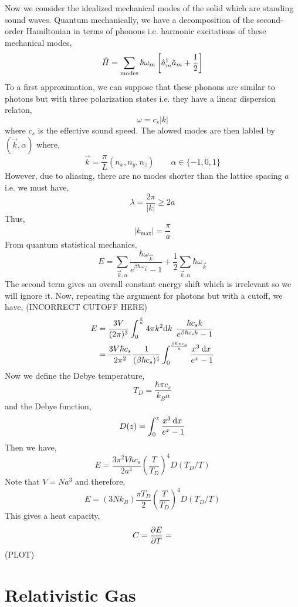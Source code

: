 \documentclass[12pt]{article}
\begin{document}
Now we consider the idealized mechanical modes of the solid which are standing sound waves. Quantum mechanically, we have a decomposition of the second-order Hamiltonian in terms of phonons i.e. harmonic excitations of these mechanical modes,
\[ \hat{H} = \sum_{\text{modes}} \hbar \omega_m \left[ \hat{a}^\dagger_m \hat{a}_m + \frac{1}{2} \right] \]
To a first approximation, we can suppose that these phonons are similar to photons but with three polarization states i.e. they have a linear dispersion relaton,
\[ \omega = c_s |k| \]
where $c_s$ is the effective sound speed. The alowed modes are then labled by $(\vec{k}, \alpha)$ where,
\[ \vec{k} = \frac{\pi}{L} (n_x, n_y, n_z) \quad \quad \alpha \in \{-1, 0, 1 \} \]
However, due to aliasing, there are no modes shorter than the lattice spacing $a$ i.e. we must have,
\[ \lambda = \frac{2 \pi}{|k|} \ge 2 a \]
Thus, 
\[ | k_{\text{max}} | = \frac{\pi}{a} \]
From quantum statistical mechanics,
\[ E = \sum_{\vec{k}, \alpha} \frac{\hbar \omega_{\vec{k}}}{e^{\beta \hbar \omega_{\vec{k}}} - 1} + \frac{1}{2} \sum_{\vec{k}, \alpha} \hbar \omega_{\vec{k}} \]
The second term gives an overall constant energy shift which is irrelevant so we will ignore it. Now, repeating the argument for photons but with a cutoff, we have, (INCORRECT CUTOFF HERE)
\begin{align*}
E & = \frac{3 V}{(2 \pi)^3} \int_0^\frac{\pi}{a} 4 \pi k^2 \mathrm{d}k \: \: \frac{\hbar c_s k}{e^{\beta \hbar c_s k} - 1} 
\\
& = \frac{3 V \hbar c_s}{2 \pi^2} \frac{1}{(\beta \hbar c_s)^4} \int_0^{\frac{\beta \hbar \pi c_s}{a}} \frac{x^3 \: \mathrm{d}x \:}{e^x - 1} 
\end{align*}
Now we define the Debye temperature,
\[ T_D = \frac{\hbar \pi c_s}{k_B a} \]
and the Debye function,
\[ D(z) = \int_0^z \frac{x^3 \: \mathrm{d}x \:}{e^x - 1} \] 
Then we have,
\[ E = \frac{3 \pi^2 V \hbar c_s}{2 a^4} \left( \frac{T}{T_D} \right)^4 D(T_D / T) \]
Note that $V = N a^3$ and therefore,
\[ E = (3 N k_B) \frac{\pi T_D}{2} \left( \frac{T}{T_D} \right)^4 D(T_D / T) \]
This gives a heat capacity,
\[ C = \frac{\partial{E}}{\partial{T}} = \]
(PLOT)

\section{Relativistic Gas}
\end{document}
